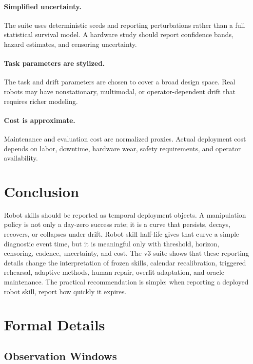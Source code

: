 \documentclass{article}
\begin{document}
\paragraph{Simplified uncertainty.}
The suite uses deterministic seeds and reporting perturbations rather than a
full statistical survival model. A hardware study should report confidence
bands, hazard estimates, and censoring uncertainty.

\paragraph{Task parameters are stylized.}
The task and drift parameters are chosen to cover a broad design space. Real
robots may have nonstationary, multimodal, or operator-dependent drift that
requires richer modeling.

\paragraph{Cost is approximate.}
Maintenance and evaluation cost are normalized proxies. Actual deployment cost
depends on labor, downtime, hardware wear, safety requirements, and operator
availability.

\section{Conclusion}

Robot skills should be reported as temporal deployment objects. A manipulation
policy is not only a day-zero success rate; it is a curve that persists,
decays, recovers, or collapses under drift. Robot skill half-life gives that
curve a simple diagnostic event time, but it is meaningful only with threshold,
horizon, censoring, cadence, uncertainty, and cost. The v3 suite shows that
these reporting details change the interpretation of frozen skills, calendar
recalibration, triggered rehearsal, adaptive methods, human repair, overfit
adaptation, and oracle maintenance. The practical recommendation is simple:
when reporting a deployed robot skill, report how quickly it expires.

\clearpage
\appendix

\section{Formal Details}

\subsection{Observation Windows}
\end{document}
